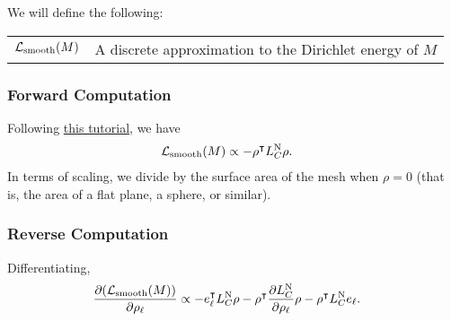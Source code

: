 

We will define the following: \begin{center}\begin{tabular}{r|l}
	\(\mathcal{L}_{\mathrm{smooth}}\pof{M}\) & A discrete approximation to the Dirichlet energy of \(M\)
\end{tabular}\end{center}

\subsubsection{Forward Computation}
Following \href{https://www.cs.cmu.edu/~kmcrane/Projects/Other/SwissArmyLaplacian.pdf#page=28}{this tutorial}, we have \begin{align*}
	\mathcal{L}_{\mathrm{smooth}}\pof{M} &\propto -\rho^\intercal L_C^{\text{N}}\rho.
\end{align*} In terms of scaling, we divide by the surface area of the mesh when \(\rho = 0\) (that is, the area of a flat plane, a sphere, or similar).

\subsubsection{Reverse Computation}
Differentiating, \begin{align*}
	\frac{\partial\pof{\mathcal{L}_{\mathrm{smooth}}\pof{M}}}{\partial\rho_\ell} &\propto -e_\ell^\intercal L_C^{\text{N}}\rho - \rho^\intercal\frac{\partial L_C^{\text{N}}}{\partial \rho_\ell}\rho - \rho^\intercal L_C^{\text{N}}e_\ell.
\end{align*}
